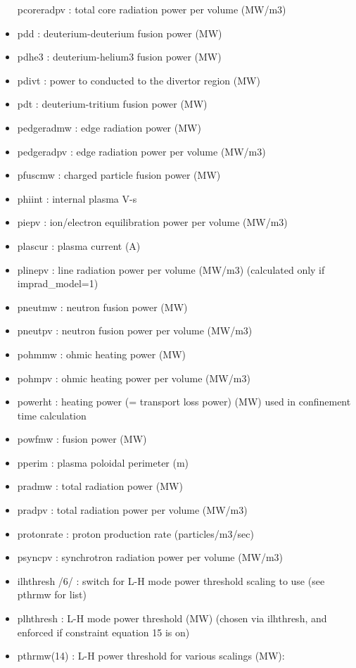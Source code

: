\documentclass[]{article}
\begin{document}
\begin{itemize}
  pcoreradpv : total core radiation power per volume (MW/m3)
\item
  pdd : deuterium-deuterium fusion power (MW)
\item
  pdhe3 : deuterium-helium3 fusion power (MW)
\item
  pdivt : power to conducted to the divertor region (MW)
\item
  pdt : deuterium-tritium fusion power (MW)
\item
  pedgeradmw : edge radiation power (MW)
\item
  pedgeradpv : edge radiation power per volume (MW/m3)
\item
  pfuscmw : charged particle fusion power (MW)
\item
  phiint : internal plasma V-s
\item
  piepv : ion/electron equilibration power per volume (MW/m3)
\item
  plascur : plasma current (A)
\item
  plinepv : line radiation power per volume (MW/m3) (calculated only if
  imprad\_model=1)
\item
  pneutmw : neutron fusion power (MW)
\item
  pneutpv : neutron fusion power per volume (MW/m3)
\item
  pohmmw : ohmic heating power (MW)
\item
  pohmpv : ohmic heating power per volume (MW/m3)
\item
  powerht : heating power (= transport loss power) (MW) used in
  confinement time calculation
\item
  powfmw : fusion power (MW)
\item
  pperim : plasma poloidal perimeter (m)
\item
  pradmw : total radiation power (MW)
\item
  pradpv : total radiation power per volume (MW/m3)
\item
  protonrate : proton production rate (particles/m3/sec)
\item
  psyncpv : synchrotron radiation power per volume (MW/m3)
\item
  ilhthresh /6/ : switch for L-H mode power threshold scaling to use
  (see pthrmw for list)
\item
  plhthresh : L-H mode power threshold (MW) (chosen via ilhthresh, and
  enforced if constraint equation 15 is on)
\item
  pthrmw(14) : L-H power threshold for various scalings (MW):


\end{itemize}
\end{document}
